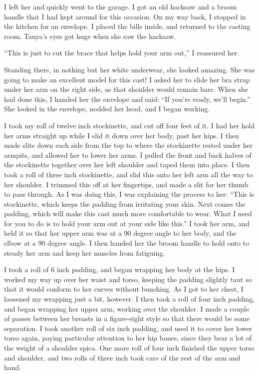 I left her and quickly went to the garage. I got an old hacksaw and a broom handle that I
had kept around for this occasion. On my way back, I stopped in the kitchen for an envelope. I
placed the bills inside, and returned to the casting room. Tanya's eyes got huge when she saw
the hacksaw.

``This is just to cut the brace that helps hold your arm out,'' I reassured her.

Standing there, in nothing but her white underwear, she looked amazing. She was going to
make an excellent model for this cast! I asked her to slide her bra strap under her arm on the
right side, as that shoulder would remain bare. When she had done this, I handed her the
envelope and said: ``If you're ready, we'll begin.'' She looked in the envelope, nodded her
head,
and I began working.

I took my roll of twelve inch stockinette, and cut off four feet of it. I had her hold her
arms straight up while I slid it down over her body, past her hips. I then made slits down each
side from the top to where the stockinette rested under her armpits, and allowed her to lower
her arms. I pulled the front and back halves of the stockinette together over her left shoulder
and taped them into place. I then took a roll of three inch stockinette, and slid this onto her
left arm all the way to her shoulder. I trimmed this off at her fingertips, and made a slit for
her thumb to pass through. As I was doing this, I was explaining the process to her: ``This is
stockinette, which keeps the padding from irritating your skin. Next comes the padding, which
will make this cast much more comfortable to wear. What I need for you to do is to hold your arm
out at your side like this.'' I took her arm, and held it so that her upper arm was at a 90
degree angle to her body, and the elbow at a 90 degree angle. I then handed her the broom handle
to hold onto to steady her arm and keep her muscles from fatiguing.

I took a roll of 6 inch padding, and began wrapping her body at the hips. I worked my way up
over her waist and torso, keeping the padding slightly taut so that it would conform to her
curves without bunching. As I got to her chest, I loosened my wrapping just a bit, however. I
then took a roll of four inch padding, and began wrapping her upper arm, working over the
shoulder. I made a couple of passes between her breasts in a figure-eight style so that there
would be some separation. I took another roll of six inch padding, and used it to cover her
lower torso again, paying particular attention to her hip bones, since they bear a lot of the
weight of a shoulder spica. One more roll of four inch finished the upper torso and shoulder,
and two rolls of three inch took care of the rest of the arm and hand.

